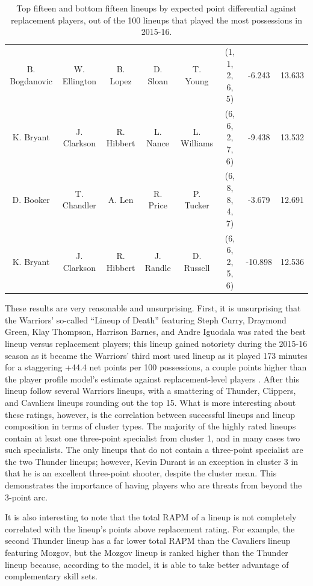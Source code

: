 \begin{table}
{\begin{tabular}{cccccccc}
    B. Bogdanovic &  W. Ellington &      B. Lopez &     D. Sloan &     T. Young &  (1, 1, 2, 6, 5) &      -6.243 &  13.633 \\
        K. Bryant &   J. Clarkson &    R. Hibbert &     L. Nance &  L. Williams &  (6, 6, 2, 7, 6) &      -9.438 &  13.532 \\
        D. Booker &   T. Chandler &        A. Len &     R. Price &    P. Tucker &  (6, 8, 8, 4, 7) &      -3.679 &  12.691 \\
        K. Bryant &   J. Clarkson &    R. Hibbert &    J. Randle &   D. Russell &  (6, 6, 2, 5, 6) &     -10.898 &  12.536 \\
\bottomrule
        \end{tabular}
    }
    \caption{Top fifteen and bottom fifteen lineups by expected point differential
    against replacement players, out of the 100 lineups that played the most
    possessions in 2015-16.}
    \label{tab:lineup_ratings}
\end{table}

These results are very reasonable and unsurprising. First, it is unsurprising that
the Warriors' so-called ``Lineup of Death'' featuring Steph Curry, Draymond Green,
Klay Thompson, Harrison Barnes, and Andre Iguodala was rated the best lineup versus
replacement players; this lineup gained notoriety during the 2015-16 season as it
became the Warriors' third most used lineup as it played 173 minutes for a
staggering +44.4 net points per 100 possessions, a couple points higher than the
player profile model's estimate against replacement-level players \cite{Ringer,
BKRef}.
After this lineup follow several Warriors lineups, with a smattering of Thunder,
Clippers, and Cavaliers lineups rounding out the top 15. What is more interesting
about these ratings, however, is the correlation between successful lineups and
lineup composition in terms of cluster types. The majority of the highly rated
lineups contain at least one three-point specialist from cluster 1, and in many
cases two such specialists. The only lineups that do not contain a three-point
specialist are the two Thunder lineups; however, Kevin Durant is an exception in
cluster 3 in that he is an excellent three-point shooter, despite the cluster mean.
This demonstrates the importance of having players who are threats from beyond the
3-point arc.

It is also interesting to note that the total RAPM of a lineup is not completely
correlated with the lineup's points above replacement rating. For example, the
second Thunder lineup has a far lower total RAPM than the Cavaliers lineup
featuring Mozgov, but the Mozgov lineup is ranked higher than the Thunder lineup
because, according to the model, it is able to take better advantage of
complementary skill sets.

